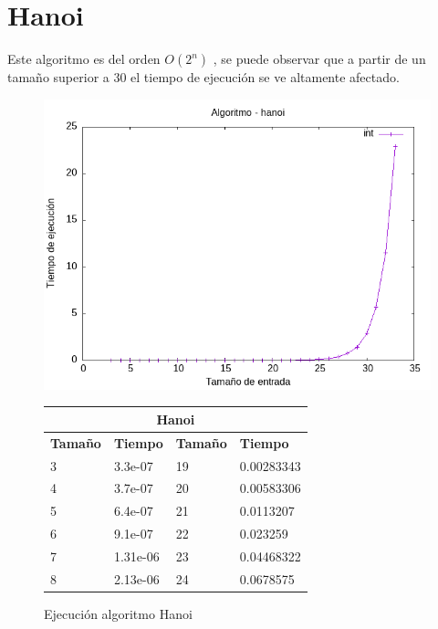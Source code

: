 \documentclass[11pt,openany]{book}
\begin{document}
\section*{Hanoi}
Este algoritmo es del orden $O(2^n)$ , se puede observar que a partir de un tamaño superior a 30 el tiempo de ejecución se ve 
altamente afectado.
\begin{figure}[H]
    \begin{minipage}{0.5\textwidth}
        \centering
        \includegraphics[width=\linewidth]{assets/Img/hanoiint.png}
        \caption{Ejecución algoritmo Hanoi}
        \label{fig:hanoi} 
    \end{minipage}%
    \begin{minipage}{0.5\textwidth}
        \centering
        \small
        \begin{tabular}{|l|l|l|l|}
        \hline
            \multicolumn{4}{|c|}{\cellcolor{blue!20}\textbf{Hanoi}} \\ \hline 
            \textbf{Tamaño} & \textbf{Tiempo} & \textbf{Tamaño} & \textbf{Tiempo} \\ \hline
            3 & 3.3e-07 & 19 & 0.00283343 \\ \hline
            4 & 3.7e-07 & 20 & 0.00583306 \\ \hline
            5 & 6.4e-07 & 21 & 0.0113207 \\ \hline
            6 & 9.1e-07 & 22 & 0.023259 \\ \hline
            7 & 1.31e-06 & 23 & 0.04468322 \\ \hline
            8 & 2.13e-06 & 24 & 0.0678575 \\ \hline

\end{tabular}
\end{minipage}
\end{figure}
\end{document}
